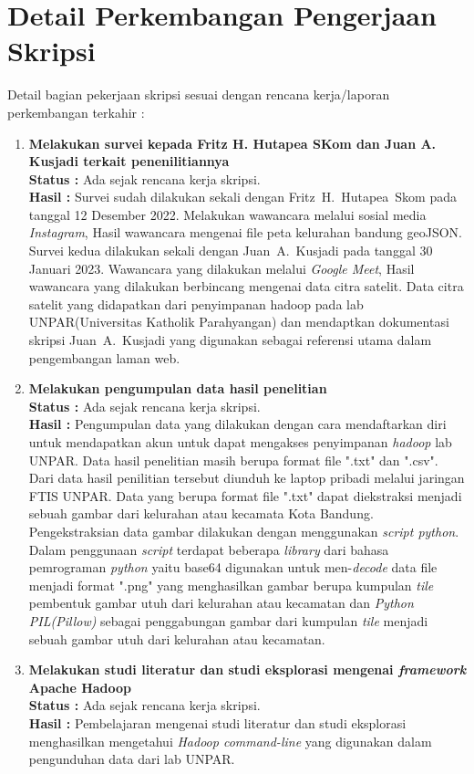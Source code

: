 \documentclass[a4paper,twoside]{article}
\begin{document}
\section{Detail Perkembangan Pengerjaan Skripsi}
Detail bagian pekerjaan skripsi sesuai dengan rencana kerja/laporan perkembangan terkahir :
	\begin{enumerate}
		\item \textbf {Melakukan survei kepada Fritz H. Hutapea SKom dan Juan A. Kusjadi terkait penenilitiannya}\\
		{\bf Status :} Ada sejak rencana kerja skripsi.\\
		{\bf Hasil :} Survei sudah dilakukan sekali dengan Fritz~H.~Hutapea~Skom pada tanggal 12 Desember 2022. Melakukan wawancara melalui sosial media \textit{Instagram}, Hasil wawancara mengenai file peta kelurahan bandung geoJSON. Survei kedua dilakukan sekali dengan Juan~A.~Kusjadi pada tanggal 30 Januari 2023. Wawancara yang dilakukan melalui \textit{Google Meet}, Hasil wawancara yang dilakukan berbincang mengenai data citra satelit. Data citra satelit yang didapatkan dari penyimpanan hadoop pada lab UNPAR(Universitas Katholik Parahyangan) dan mendaptkan dokumentasi skripsi Juan~A.~Kusjadi yang digunakan sebagai referensi utama dalam pengembangan laman web.
		
		\item \textbf{ Melakukan pengumpulan data hasil penelitian}\\
		{\bf Status :} Ada sejak rencana kerja skripsi.\\
		{\bf Hasil :} Pengumpulan data yang dilakukan dengan cara mendaftarkan diri untuk mendapatkan akun untuk dapat mengakses penyimpanan \textit{hadoop} lab UNPAR. Data hasil penelitian masih berupa format file ".txt" dan ".csv". Dari data hasil penilitian tersebut diunduh ke laptop pribadi melalui jaringan FTIS UNPAR. Data yang berupa format file ".txt" dapat diekstraksi menjadi sebuah gambar dari kelurahan atau kecamata Kota Bandung. Pengekstraksian data gambar dilakukan dengan menggunakan \textit{script python}. Dalam penggunaan \textit{script} terdapat beberapa \textit{library} dari bahasa pemrograman \textit{python} yaitu base64 digunakan untuk men-\textit{decode} data file menjadi format ".png" yang menghasilkan gambar berupa kumpulan \textit{tile} pembentuk gambar utuh dari kelurahan atau kecamatan dan \textit{Python PIL(Pillow)} sebagai penggabungan gambar dari kumpulan \textit{tile} menjadi sebuah gambar utuh dari kelurahan atau kecamatan.
		
		\item \textbf{Melakukan studi literatur dan studi eksplorasi mengenai \textit{framework} Apache Hadoop}\\
		{\bf Status :} Ada sejak rencana kerja skripsi.\\
		{\bf Hasil :} Pembelajaran mengenai studi literatur dan studi eksplorasi menghasilkan mengetahui \textit{Hadoop command-line} yang digunakan dalam pengunduhan data dari lab UNPAR.
		

\end{enumerate}
\end{document}
